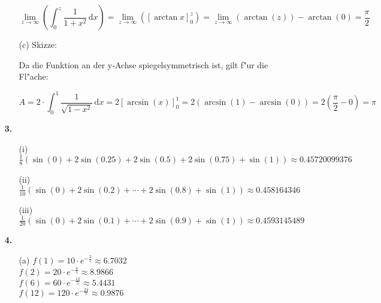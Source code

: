 \documentclass[a4paper,11pt,fleqn]{scrartcl}
\newcommand{\bra}[1]{\left(#1\right)}
\newcommand{\limz}[1]{\lim\limits_{z \rightarrow \infty}\bra{#1}}
\newcommand{\dX}[1]{\, \mathrm{d}#1}
\newcommand{\dx}[0]{\dX{x}}
\begin{document}
\begin{enumerate}
\begin{enumerate}
                \[ \limz{\int_0^z \frac{1}{1+x^2} \dx} = \limz{\left[ \arctan x \right]_0^z}  =
                    \limz{\arctan(z)} - \arctan(0) = \frac{\pi}{2} \]

            \item[(c)]
                Skizze:


                Da die Funktion an der y-Achse spiegelsymmetrisch ist, gilt f"ur die Fl"ache:

                \[ A = 2 \cdot \int_0^1 \frac{1}{\sqrt{1-x^2}} \dx = 2 \left[ \arcsin(x) \right]_0^1 = 2 \bra{\arcsin(1)-\arcsin(0)} = 2(\frac{\pi}{2} - 0) = \pi \]

        \end{enumerate}
    \item[\textbf{3.}]
        \begin{enumerate}
            \item[(i)]
                \( \frac{1}{8} \bra{ \sin(0) + 2\sin(0.25) + 2\sin(0.5)  + 2\sin(0.75)  + \sin(1) } \approx 0.45720099376 \)

            \item[(ii)]
                \( \frac{1}{10} \bra{ \sin(0) + 2\sin(0.2) + \cdots + 2\sin(0.8) + \sin(1) } \approx 0.458164346 \)

            \item[(iii)]
                \( \frac{1}{20} \bra{ \sin(0) + 2\sin(0.1) + \cdots + 2\sin(0.9) + \sin(1) } \approx 0.4593145489 \)
        \end{enumerate}
    \item[\textbf{4.}]
        \begin{enumerate}
            \item[(a)]
                \( f( 1) =  10 \cdot e^{-\frac{ 2}{5}} \approx 6.7032 \)\\
                \( f( 2) =  20 \cdot e^{-\frac{ 4}{5}} \approx 8.9866 \)\\
                \( f( 6) =  60 \cdot e^{-\frac{12}{5}} \approx 5.4431 \)\\
                \( f(12) = 120 \cdot e^{-\frac{24}{5}} \approx 0.9876 \)\\


\end{enumerate}
\end{enumerate}
\end{document}
